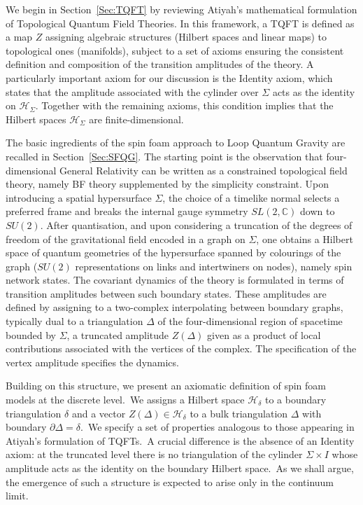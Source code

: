 \documentclass[11pt]{article}
\theoremstyle{definition}
\numberwithin{equation}{section}
\begin{document}
We begin in Section~\ref{Sec:TQFT} by reviewing Atiyah’s mathematical formulation of Topological Quantum Field Theories. In this framework, a TQFT is defined as a map $Z$ assigning algebraic structures (Hilbert spaces and linear maps) to topological ones (manifolds), subject to a set of axioms ensuring the consistent definition and composition of the transition amplitudes of the theory. A particularly important axiom for our discussion is the Identity axiom, which states that the amplitude associated with the cylinder over $\Sigma$ acts as the identity on $\mathcal H_\Sigma$. Together with the remaining axioms, this condition implies that the Hilbert spaces $\mathcal H_\Sigma$ are finite-dimensional. 

The basic ingredients of the spin foam approach to Loop Quantum Gravity are recalled in Section~\ref{Sec:SFQG}. The starting point is the observation that four-dimensional General Relativity can be written as a constrained topological field theory, namely BF theory supplemented by the simplicity constraint. Upon introducing a spatial hypersurface $\Sigma$, the choice of a timelike normal selects a preferred frame and breaks the internal gauge symmetry $SL(2,\mathbb{C})$ down to $SU(2)$. After quantisation, and upon considering a truncation of the degrees of freedom of the gravitational field encoded in a graph on $\Sigma$, one obtains a Hilbert space of quantum geometries of the hypersurface spanned by colourings of the graph ($SU(2)$ representations on links and intertwiners on nodes), namely spin network states.
The covariant dynamics of the theory is formulated in terms of transition amplitudes between such boundary states. These amplitudes are defined by assigning to a two-complex interpolating between boundary graphs, typically dual to a triangulation $\Delta$ of the four-dimensional region of spacetime bounded by $\Sigma$, a truncated amplitude $Z(\Delta)$ given as a product of local contributions associated with the vertices of the complex. The specification of the vertex amplitude specifies the dynamics.

Building on this structure, we present an axiomatic definition of spin foam models at the discrete level.~We assigns a Hilbert space $\mathcal H_\delta$ to a boundary triangulation $\delta$ and a vector $Z(\Delta)\in\mathcal H_\delta$ to a bulk triangulation $\Delta$ with boundary $\partial\Delta=\delta$.~We specify a set of properties analogous to those appearing in Atiyah’s formulation of TQFTs.~A crucial difference is the absence of an Identity axiom: at the truncated level there is no triangulation of the cylinder $\Sigma\times I$ whose amplitude acts as the identity on the boundary Hilbert space.~As we shall argue, the emergence of such a structure is expected to arise only in the continuum limit.
\end{document}
